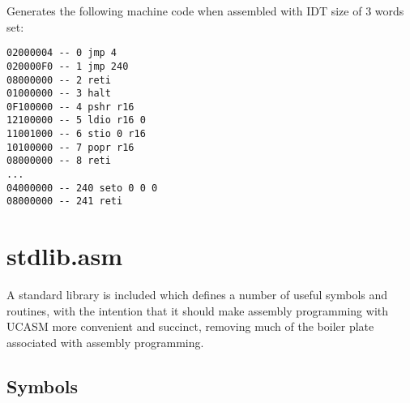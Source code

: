 \documentclass[12pt,twoside]{report}
\begin{document}
Generates the following machine code when assembled with IDT size of 3
words set:

\begin{verbatim}
02000004 -- 0 jmp 4
020000F0 -- 1 jmp 240
08000000 -- 2 reti
01000000 -- 3 halt
0F100000 -- 4 pshr r16
12100000 -- 5 ldio r16 0
11001000 -- 6 stio 0 r16
10100000 -- 7 popr r16
08000000 -- 8 reti
...
04000000 -- 240 seto 0 0 0
08000000 -- 241 reti
\end{verbatim}

\newpage
\section{stdlib.asm}

A standard library is included which defines a number of useful
symbols and routines, with the intention that it should make assembly
programming with UCASM more convenient and succinct, removing much of
the boiler plate associated with assembly programming.

\subsection{Symbols}
\end{document}
